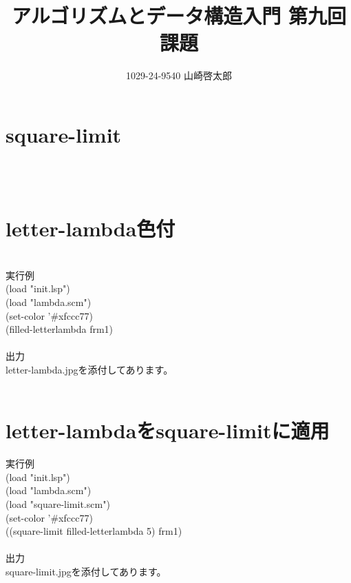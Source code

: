 ﻿\documentclass[a4paper,12pt]{article}
\title{アルゴリズムとデータ構造入門 第九回課題}
\author{1029-24-9540 山崎啓太郎}
\begin{document}
\maketitle

\section{square-limit}
\lstset{numbers=left,basicstyle=\small}

\\
\\
\section{letter-lambda色付}
\lstset{numbers=left,basicstyle=\small}

\\
{\large 実行例}\\
(load "init.lsp")\\
(load "lambda.scm")\\
(set-color '\#xfccc77)\\
(filled-letterlambda frm1)\\
\\
{\large 出力}\\
letter-lambda.jpgを添付してあります。\\
\\
\section{letter-lambdaをsquare-limitに適用}
{\large 実行例}\\
(load "init.lsp")\\
(load "lambda.scm")\\
(load "square-limit.scm")\\
(set-color '\#xfccc77)\\
((square-limit filled-letterlambda 5) frm1)\\
\\
{\large 出力}\\
square-limit.jpgを添付してあります。\\
\\
\end{document}
